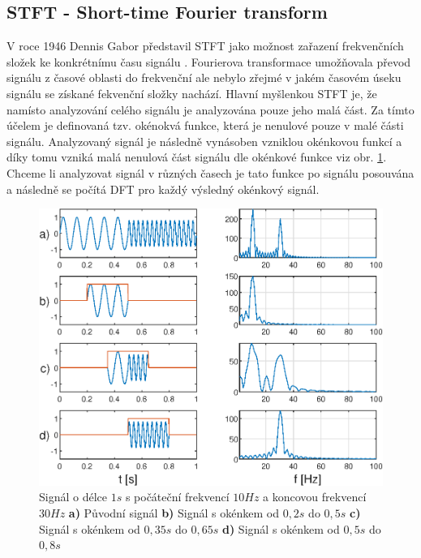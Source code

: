   
  \subsection{STFT - Short-time Fourier transform} \label{sec:STFT}

  V roce 1946 Dennis Gabor představil \acs{STFT} jako možnost zařazení frekvenčních složek ke konkrétnímu času signálu \cite{strichartz2003guide}.
  Fourierova transformace umožňovala převod signálu z časové oblasti do frekvenční ale nebylo zřejmé v jakém časovém úseku signálu se získané fekvenční složky nachází.
  Hlavní myšlenkou \acs{STFT} je, že namísto analyzování celého signálu je analyzována pouze jeho malá část.
  Za tímto účelem je definovaná tzv. okénokvá funkce, která je nenulové pouze v malé části signálu.
  Analyzovaný signál je následně vynásoben vzniklou okénkovou funkcí a díky tomu vzniká malá nenulová část signálu dle okénkové funkce viz obr. \ref{fig:STFT}.
  Chceme li analyzovat signál v různých časech je tato funkce po signálu posouvána a následně se počítá \acs{DFT} pro každý výsledný okénkový signál.

  \begin{figure}[H]
    \centering
    \includegraphics[width = 1\linewidth]{obrazky/STFT.eps}
    \caption{Signál o délce $1 s$ s počáteční frekvencí $10 Hz$ a koncovou frekvencí $30 Hz$ \textbf{a)} Původní signál \textbf{b)} Signál s okénkem od $0,2 s$ do $0,5 s$ \textbf{c)} Signál s okénkem od $0,35 s$ do $0,65 s$ \textbf{d)} Signál s okénkem od $0,5 s$ do $0,8 s$ \cite{fundamental_of_music_processing}}
    \label{fig:STFT}
  \end{figure}

